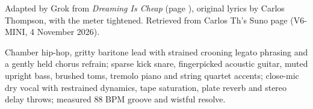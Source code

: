 
\label{sec:urban-signal}
\begin{notes}
Adapted by Grok from \emph{Dreaming Is Cheap} (page \pageref{sec:dreaming-is-cheap}), original lyrics by Carlos Thompson, with the meter tightened. Retrieved from Carlos Th's Suno page (V6-MINI, 4 November 2026).
\end{notes}
\begin{style}
Chamber hip-hop, gritty baritone lead with strained crooning legato phrasing and a gently held chorus refrain; sparse kick snare, fingerpicked acoustic guitar, muted upright bass, brushed toms, tremolo piano and string quartet accents; close-mic dry vocal with restrained dynamics, tape saturation, plate reverb and stereo delay throws; measured 88 BPM groove and wistful resolve.
\end{style}
